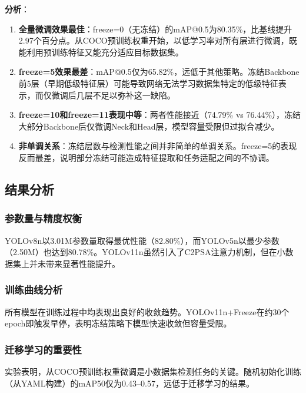 \documentclass[12pt,a4paper]{article}
\begin{document}
\textbf{分析}：

\begin{enumerate}[noitemsep]
  \item \textbf{全量微调效果最佳}：freeze=0（无冻结）的mAP@0.5为80.35\%，比基线提升2.97个百分点。从COCO预训练权重开始，以低学习率对所有层进行微调，既能利用预训练特征又能充分适应目标数据集。

  \item \textbf{freeze=5效果最差}：mAP@0.5仅为65.82\%，远低于其他策略。冻结Backbone前5层（早期低级特征层）可能导致网络无法学习数据集特定的低级特征表示，而仅微调后几层不足以弥补这一缺陷。

  \item \textbf{freeze=10和freeze=11表现中等}：两者性能接近（74.79\% vs 76.44\%），冻结大部分Backbone后仅微调Neck和Head层，模型容量受限但过拟合减少。

  \item \textbf{非单调关系}：冻结层数与检测性能之间并非简单的单调关系。freeze=5的表现反而最差，说明部分冻结可能造成特征提取和任务适配之间的不协调。
\end{enumerate}

\subsection{结果分析}

\subsubsection{参数量与精度权衡}
YOLOv8n以3.01M参数量取得最优性能（82.80\%），而YOLOv5n以最少参数（2.50M）也达到80.78\%。YOLOv11n虽然引入了C2PSA注意力机制，但在小数据集上并未带来显著性能提升。

\subsubsection{训练曲线分析}
所有模型在训练过程中均表现出良好的收敛趋势。YOLOv11n+Freeze在约30个epoch即触发早停，表明冻结策略下模型快速收敛但容量受限。

\subsubsection{迁移学习的重要性}
实验表明，从COCO预训练权重微调是小数据集检测任务的关键。随机初始化训练（从YAML构建）的mAP50仅为0.43--0.57，远低于迁移学习的结果。

\end{document}
